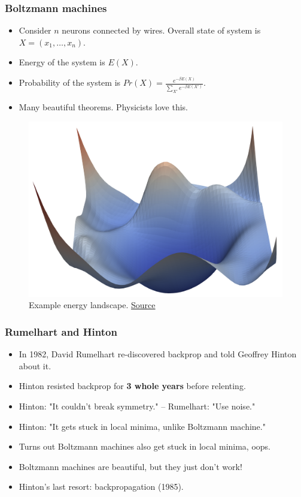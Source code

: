 \documentclass{beamer}
\begin{document}
\begin{frame}
\frametitle{Boltzmann machines}

\begin{itemize}
    \item Consider $n$ neurons connected by wires. Overall state of system is $X = (x_1, \dots, x_n)$.
    \item Energy of the system is $E(X)$.
    \item Probability of the system is $Pr(X) = \frac{e^{-\beta E(X)}}{\sum_{X'} e^{-\beta E(X')}}$.
    \item Many beautiful theorems. Physicists love this. 
\end{itemize}

\begin{figure}[t]
    \includegraphics[width=\textwidth]{figure/energy_landscape.png}
    \centering
    \caption{Example energy landscape. \href{https://www.cs.umd.edu/~tomg/projects/landscapes/}{Source}}
\end{figure}

\end{frame}

\begin{frame}
\frametitle{Rumelhart and Hinton}

\begin{itemize}
    \item In 1982, David Rumelhart re-discovered backprop and told Geoffrey Hinton about it.
    \item Hinton resisted backprop for \textbf{3 whole years} before relenting.
    \item Hinton: "It couldn't break symmetry." -- Rumelhart: "Use noise."
    \item Hinton: "It gets stuck in local minima, unlike Boltzmann machine."
    \item Turns out Boltzmann machines also get stuck in local minima, oops.
    \item Boltzmann machines are beautiful, but they just don't work!
    \item Hinton's last resort: backpropagation (1985).
\end{itemize}
\end{frame}
\end{document}
